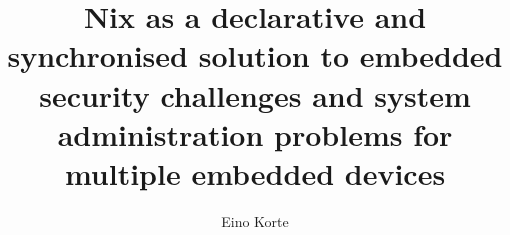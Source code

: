 \documentclass[language=english,version=final,mainfont=none,sharelatex=false]{utuftthesis}
\providecommand{\algorithmname}{Algoritmi}
\begin{document}
\title{Nix as a declarative and synchronised solution to embedded security challenges and system administration problems for multiple embedded devices}
\author{Eino Korte}

\maketitle


\tableofcontents

\listoffigures

\listoftables

\listofacronyms

\renewcommand{\algorithmname}{\listingscaption}


\begin{comment}
To better organize things, create a new tex file for each chapter
and input it below.

Avoid using the å, ä, ö or <space> characters in referred names and
underscores \_ in file names (may break hyperref).

Good luck!
\end{comment}

    

%
%


\printbibliography

\begin{comment}
Important! Create the appendix chapters with command \textbackslash appchapter\{some
name\} instead of \textbackslash chapter\{some name\} for the automagic
page counting to work!
\end{comment}




\end{document}
